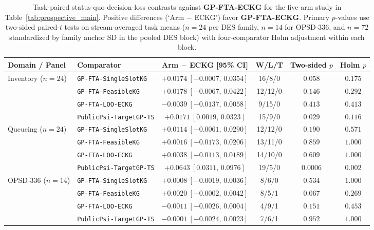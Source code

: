 \begin{table}[htbp]
\centering
\caption{Task-paired status-quo decision-loss contrasts against \textbf{GP-FTA-ECKG} for the five-arm study in Table~\ref{tab:prospective_main}. Positive differences (`Arm $-$ ECKG') favor \textbf{GP-FTA-ECKG}. Primary $p$-values use two-sided paired-$t$ tests on stream-averaged task means ($n=24$ per DES family, $n=14$ for OPSD-336, and $n=72$ standardized by family anchor SD in the pooled DES block) with four-comparator Holm adjustment within each block.}\label{tab:prospective_contrasts}
\footnotesize
\setlength{\tabcolsep}{4.2pt}
\begin{tabular}{llcccc}
\toprule
\textbf{Domain / Panel} & \textbf{Comparator} & \textbf{Arm $-$ ECKG [95\% CI]} & \textbf{W/L/T} & \textbf{Two-sided $p$} & \textbf{Holm $p$} \\
\midrule
\multirow{4}{*}{Inventory ($n=24$)} & \texttt{GP-FTA-SingleSlotKG} & $+0.0174\ [-0.0007,\,0.0354]$ & 16/8/0 & $0.058$ & $0.175$ \\
 & \texttt{GP-FTA-FeasibleKG} & $+0.0178\ [-0.0067,\,0.0422]$ & 12/12/0 & $0.146$ & $0.292$ \\
 & \texttt{GP-FTA-LOO-ECKG} & $-0.0039\ [-0.0137,\,0.0058]$ & 9/15/0 & $0.413$ & $0.413$ \\
 & \texttt{PublicPsi-TargetGP-TS} & $+0.0171\ [0.0019,\,0.0323]$ & 15/9/0 & $0.029$ & $0.116$ \\
\midrule
\multirow{4}{*}{Queueing ($n=24$)} & \texttt{GP-FTA-SingleSlotKG} & $+0.0114\ [-0.0061,\,0.0290]$ & 12/12/0 & $0.190$ & $0.571$ \\
 & \texttt{GP-FTA-FeasibleKG} & $+0.0016\ [-0.0173,\,0.0206]$ & 13/11/0 & $0.859$ & $1.000$ \\
 & \texttt{GP-FTA-LOO-ECKG} & $+0.0038\ [-0.0113,\,0.0189]$ & 14/10/0 & $0.609$ & $1.000$ \\
 & \texttt{PublicPsi-TargetGP-TS} & $+0.0643\ [0.0311,\,0.0976]$ & 19/5/0 & $0.0006$ & $0.002$ \\
\midrule
\multirow{4}{*}{OPSD-336 ($n=14$)} & \texttt{GP-FTA-SingleSlotKG} & $+0.0008\ [-0.0019,\,0.0036]$ & 8/6/0 & $0.534$ & $1.000$ \\
 & \texttt{GP-FTA-FeasibleKG} & $+0.0020\ [-0.0002,\,0.0042]$ & 8/5/1 & $0.067$ & $0.269$ \\
 & \texttt{GP-FTA-LOO-ECKG} & $-0.0011\ [-0.0026,\,0.0004]$ & 4/9/1 & $0.151$ & $0.453$ \\
 & \texttt{PublicPsi-TargetGP-TS} & $-0.0001\ [-0.0024,\,0.0023]$ & 7/6/1 & $0.952$ & $1.000$ \\

\end{tabular}
\end{table}
